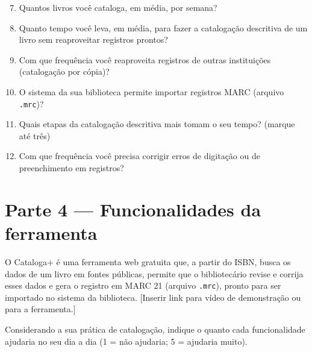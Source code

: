 \begin{enumerate}
    \setcounter{enumi}{6}
    \item Quantos livros você cataloga, em média, por semana?\\
    \item Quanto tempo você leva, em média, para fazer a catalogação descritiva de um livro sem reaproveitar registros prontos?\\
    \item Com que frequência você reaproveita registros de outras instituições (catalogação por cópia)?\\
    \item O sistema da sua biblioteca permite importar registros MARC (arquivo \texttt{.mrc})?\\
    \item Quais etapas da catalogação descritiva mais tomam o seu tempo? (marque até três)\\
    \item Com que frequência você precisa corrigir erros de digitação ou de preenchimento em registros?\\
\end{enumerate}

\section*{Parte 4 --- Funcionalidades da ferramenta}

O Cataloga+ é uma ferramenta web gratuita que, a partir do ISBN, busca os dados de um livro em fontes públicas, permite que o bibliotecário revise e corrija esses dados e gera o registro em MARC 21 (arquivo \texttt{.mrc}), pronto para ser importado no sistema da biblioteca. [Inserir link para vídeo de demonstração ou para a ferramenta.]

Considerando a sua prática de catalogação, indique o quanto cada funcionalidade ajudaria no seu dia a dia (1 = não ajudaria; 5 = ajudaria muito).

